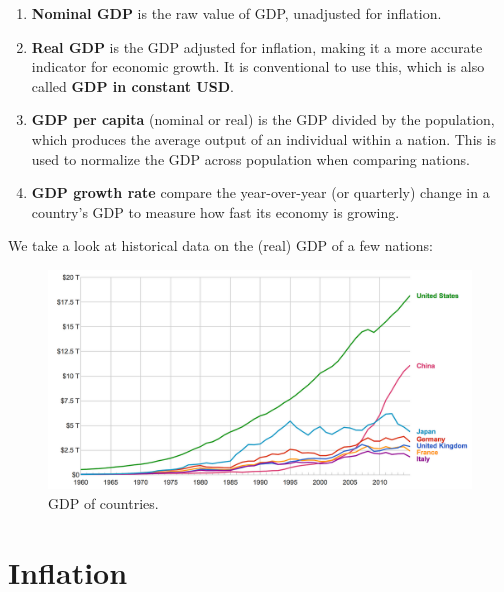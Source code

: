 \documentclass{article}
\begin{document}
  \begin{enumerate}
    \item \textbf{Nominal GDP} is the raw value of GDP, unadjusted for inflation.
    \item \textbf{Real GDP} is the GDP adjusted for inflation, making it a more accurate indicator for economic growth. It is conventional to use this, which is also called \textbf{GDP in constant USD}.
    \item \textbf{GDP per capita} (nominal or real) is the GDP divided by the population, which produces the average output of an individual within a nation. This is used to normalize the GDP across population when comparing nations.
    \item \textbf{GDP growth rate} compare the year-over-year (or quarterly) change in a country's GDP to measure how fast its economy is growing.
  \end{enumerate}

  We take a look at historical data on the (real) GDP of a few nations:

  \begin{figure}[H]
    \centering 
    \includegraphics[scale=0.25]{img/GDP.png}
    \caption{GDP of countries. } 
    \label{fig:GDP_data}
  \end{figure}

\section{Inflation}
\end{document}
